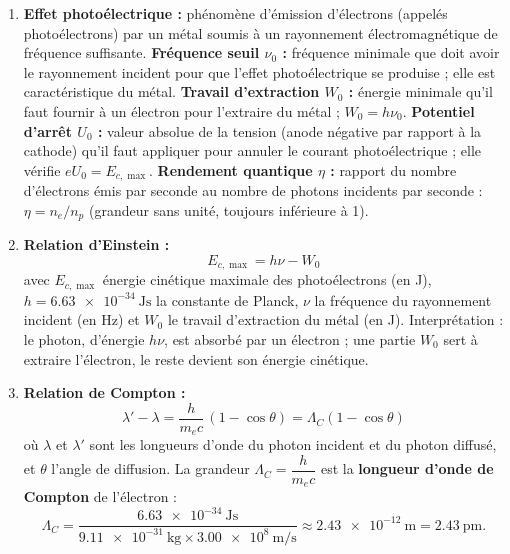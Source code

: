 \documentclass[11pt]{article}
\begin{document}
\begin{corrige}
\begin{enumerate}
\item \textbf{Effet photoélectrique :} phénomène d'émission d'électrons (appelés photoélectrons) par un métal soumis à un rayonnement électromagnétique de fréquence suffisante. \textbf{Fréquence seuil $\nu_0$ :} fréquence minimale que doit avoir le rayonnement incident pour que l'effet photoélectrique se produise ; elle est caractéristique du métal. \textbf{Travail d'extraction $W_0$ :} énergie minimale qu'il faut fournir à un électron pour l'extraire du métal ; $W_0 = h\nu_0$. \textbf{Potentiel d'arrêt $U_0$ :} valeur absolue de la tension (anode négative par rapport à la cathode) qu'il faut appliquer pour annuler le courant photoélectrique ; elle vérifie $eU_0 = E_{c,\max}$. \textbf{Rendement quantique $\eta$ :} rapport du nombre d'électrons émis par seconde au nombre de photons incidents par seconde : $\eta = n_e/n_p$ (grandeur sans unité, toujours inférieure à 1).
\item \textbf{Relation d'Einstein :}
\[ E_{c,\max} = h\nu - W_0 \]
avec $E_{c,\max}$ énergie cinétique maximale des photoélectrons (en J), $h = \SI{6,63e-34}{\joule\second}$ la constante de Planck, $\nu$ la fréquence du rayonnement incident (en Hz) et $W_0$ le travail d'extraction du métal (en J). Interprétation : le photon, d'énergie $h\nu$, est absorbé par un électron ; une partie $W_0$ sert à extraire l'électron, le reste devient son énergie cinétique.
\item \textbf{Relation de Compton :}
\[ \lambda' - \lambda = \frac{h}{m_e c}\,(1 - \cos\theta) = \Lambda_C(1-\cos\theta) \]
où $\lambda$ et $\lambda'$ sont les longueurs d'onde du photon incident et du photon diffusé, et $\theta$ l'angle de diffusion. La grandeur $\Lambda_C = \dfrac{h}{m_e c}$ est la \textbf{longueur d'onde de Compton} de l'électron :
\[ \Lambda_C = \frac{\SI{6,63e-34}{\joule\second}}{\SI{9,11e-31}{\kilogram}\times\SI{3,00e8}{\meter\per\second}} \approx \SI{2,43e-12}{\meter} = \SI{2,43}{\pico\meter}. \]
\end{enumerate}
\end{corrige}
\end{document}
